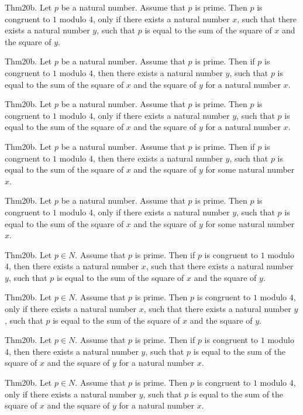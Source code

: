 \documentclass{article}
\begin{document}
Thm20b. Let $p$ be a natural number. Assume that $p$ is prime. Then $p$ is congruent to $1$ modulo $4$, only if there exists a natural number $x$, such that there exists a natural number $y$, such that $p$ is equal to the sum of the square of $x$ and the square of $y$.

Thm20b. Let $p$ be a natural number. Assume that $p$ is prime. Then if $p$ is congruent to $1$ modulo $4$, then there exists a natural number $y$, such that $p$ is equal to the sum of the square of $x$ and the square of $y$ for a natural number $x$.

Thm20b. Let $p$ be a natural number. Assume that $p$ is prime. Then $p$ is congruent to $1$ modulo $4$, only if there exists a natural number $y$, such that $p$ is equal to the sum of the square of $x$ and the square of $y$ for a natural number $x$.

Thm20b. Let $p$ be a natural number. Assume that $p$ is prime. Then if $p$ is congruent to $1$ modulo $4$, then there exists a natural number $y$, such that $p$ is equal to the sum of the square of $x$ and the square of $y$ for some natural number $x$.

Thm20b. Let $p$ be a natural number. Assume that $p$ is prime. Then $p$ is congruent to $1$ modulo $4$, only if there exists a natural number $y$, such that $p$ is equal to the sum of the square of $x$ and the square of $y$ for some natural number $x$.

Thm20b. Let $p \in N$. Assume that $p$ is prime. Then if $p$ is congruent to $1$ modulo $4$, then there exists a natural number $x$, such that there exists a natural number $y$, such that $p$ is equal to the sum of the square of $x$ and the square of $y$.

Thm20b. Let $p \in N$. Assume that $p$ is prime. Then $p$ is congruent to $1$ modulo $4$, only if there exists a natural number $x$, such that there exists a natural number $y$, such that $p$ is equal to the sum of the square of $x$ and the square of $y$.

Thm20b. Let $p \in N$. Assume that $p$ is prime. Then if $p$ is congruent to $1$ modulo $4$, then there exists a natural number $y$, such that $p$ is equal to the sum of the square of $x$ and the square of $y$ for a natural number $x$.

Thm20b. Let $p \in N$. Assume that $p$ is prime. Then $p$ is congruent to $1$ modulo $4$, only if there exists a natural number $y$, such that $p$ is equal to the sum of the square of $x$ and the square of $y$ for a natural number $x$.
\end{document}
